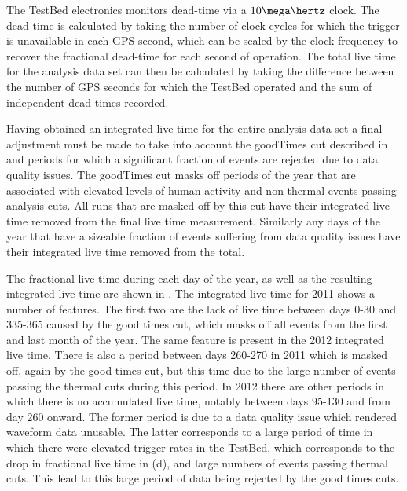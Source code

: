 The TestBed electronics monitors dead-time via a $10 \mega \hertz$ clock. The dead-time is calculated by taking the number of clock cycles for which the trigger is unavailable in each GPS second, which can be scaled by the clock frequency to recover the fractional dead-time for each second of operation. The total live time for the analysis data set can then be calculated by taking the difference between the number of GPS seconds for which the TestBed operated and the sum of independent dead times recorded. 

Having obtained an integrated live time for the entire analysis data set a final adjustment must be made to take into account the goodTimes cut described in  and periods for which a significant fraction of events are rejected due to data quality issues. The goodTimes cut masks off periods of the year that are associated with elevated levels of human activity and non-thermal events passing analysis cuts. All runs that are masked off by this cut have their integrated live time removed from the final live time measurement. Similarly any days of the year that have a sizeable fraction of events suffering from data quality issues have their integrated live time removed from the total. 


The fractional live time during each day of the year, as well as the resulting integrated live time are shown in . The integrated live time for 2011 shows a number of features. The first two are the lack of live time between days 0-30 and 335-365 caused by the good times cut, which masks off all events from the first and last month of the year. The same feature is present in the 2012 integrated live time. There is also a period between days 260-270 in 2011 which is masked off, again by the good times cut, but this time due to the large number of events passing the thermal cuts during this period. In 2012 there are other periods in which there is no accumulated live time, notably between days 95-130 and from day 260 onward. The former period is due to a data quality issue which rendered waveform data unusable. The latter corresponds to a large period of time in which there were elevated trigger rates in the TestBed, which corresponds to the drop in fractional live time in  (d), and large numbers of events passing thermal cuts. This lead to this large period of data being rejected by the good times cuts.

